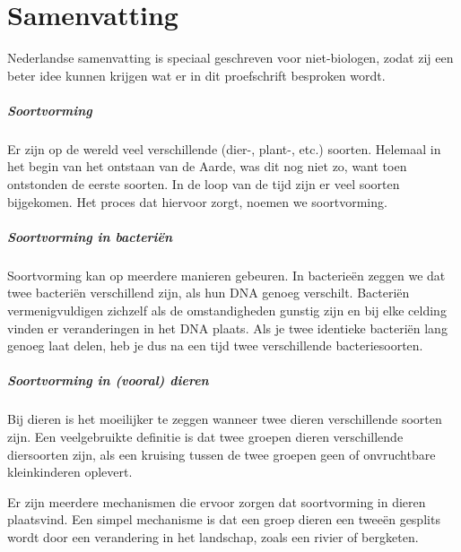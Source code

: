 \chapter*{Samenvatting}

{

\noindent 
{} Nederlandse samenvatting is speciaal geschreven
voor niet-biologen, zodat zij een beter idee kunnen
krijgen wat er in dit proefschrift besproken wordt.

\paragraph{Soortvorming}

Er zijn op de wereld veel verschillende (dier-, plant-, etc.) soorten.
Helemaal in het begin van het ontstaan van de Aarde, 
was dit nog niet zo, want toen ontstonden de eerste soorten.
In de loop van de tijd zijn er veel soorten bijgekomen.
Het proces dat hiervoor zorgt, noemen we soortvorming.

\paragraph{Soortvorming in bacteriën}

Soortvorming kan op meerdere manieren gebeuren.
In bacterieën zeggen we dat twee bacteriën verschillend zijn,
als hun DNA genoeg verschilt. Bacteriën vermenigvuldigen zichzelf
als de omstandigheden gunstig zijn en bij elke celding vinden
er veranderingen in het DNA plaats. Als je twee identieke bacteriën
lang genoeg laat delen, heb je dus na een tijd twee verschillende 
bacteriesoorten.

\paragraph{Soortvorming in (vooral) dieren}

Bij dieren is het moeilijker te zeggen wanneer twee dieren
verschillende soorten zijn. Een veelgebruikte definitie is dat
twee groepen dieren verschillende diersoorten zijn, als een kruising
tussen de twee groepen geen of onvruchtbare kleinkinderen oplevert.

Er zijn meerdere mechanismen die ervoor zorgen 
dat soortvorming in dieren plaatsvind. 
Een simpel mechanisme is dat een groep dieren een tweeën gesplits
wordt door een verandering in het landschap, 
zoals een rivier of bergketen.

}
